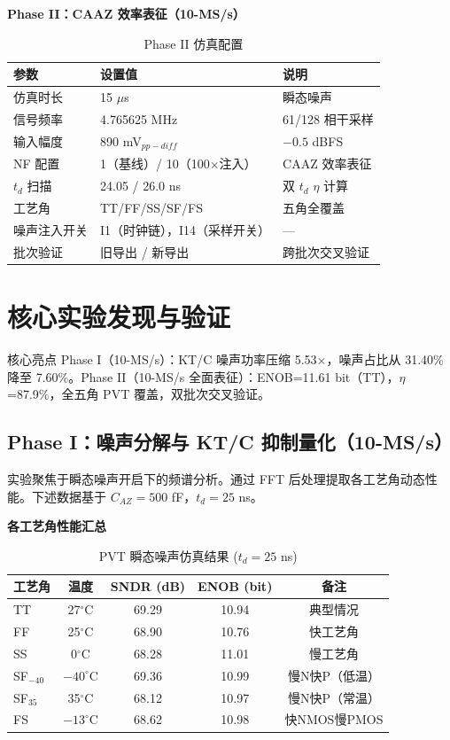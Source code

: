 \documentclass[11pt,a4paper,UTF8]{ctexart}
\begin{document}
\textbf{Phase II：CAAZ 效率表征（10-MS/s）}

\begin{table}[htbp]\centering\caption{Phase II 仿真配置}\label{tab:sim2}\small
\begin{tabular}{lll}\toprule
\textbf{参数} & \textbf{设置值} & \textbf{说明} \\\midrule
仿真时长 & 15 $\mu$s & 瞬态噪声 \\
信号频率 & 4.765625 MHz & 61/128 相干采样 \\
输入幅度 & 890 mV$_{pp-diff}$ & $-0.5$ dBFS \\
NF 配置 & 1（基线）/ 10（100$\times$注入） & CAAZ 效率表征 \\
$t_d$ 扫描 & 24.05 / 26.0 ns & 双 $t_d$ $\eta$ 计算 \\
工艺角 & TT/FF/SS/SF/FS & 五角全覆盖 \\
噪声注入开关 & I1（时钟链），I14（采样开关） & — \\
批次验证 & 旧导出 / 新导出 & 跨批次交叉验证 \\\bottomrule
\end{tabular}
\end{table}

\section{核心实验发现与验证}
\label{sec:results}

\begin{findbox}{核心亮点}
Phase I（10-MS/s）：KT/C 噪声功率压缩 5.53$\times$，噪声占比从 31.40\% 降至 7.60\%。Phase II（10-MS/s 全面表征）：ENOB=11.61 bit（TT），$\eta$=87.9\%，全五角 PVT 覆盖，双批次交叉验证。
\end{findbox}

\subsection{Phase I：噪声分解与 KT/C 抑制量化（10-MS/s）}

实验聚焦于瞬态噪声开启下的频谱分析。通过 FFT 后处理提取各工艺角动态性能。下述数据基于 $C_{AZ}=500$ fF，$t_d=25$ ns。

\textbf{各工艺角性能汇总}

\begin{table}[htbp]\centering\caption{PVT 瞬态噪声仿真结果 ($t_d=25$ ns)}\label{tab:pvt1}\small
\begin{tabular}{lcccc}\toprule
\textbf{工艺角} & \textbf{温度} & \textbf{SNDR (dB)} & \textbf{ENOB (bit)} & \textbf{备注} \\\midrule
TT & 27$^\circ$C & 69.29 & 10.94 & 典型情况 \\
FF & 25$^\circ$C & 68.90 & 10.76 & 快工艺角 \\
SS & 0$^\circ$C & 68.28 & 11.01 & 慢工艺角 \\
SF$_{-40}$ & $-40^\circ$C & 69.36 & 10.99 & 慢N快P（低温） \\
SF$_{35}$ & 35$^\circ$C & 68.12 & 10.97 & 慢N快P（常温） \\
FS & $-13^\circ$C & 68.62 & 10.98 & 快NMOS慢PMOS \\\bottomrule
\end{tabular}
\end{table}
\end{document}
